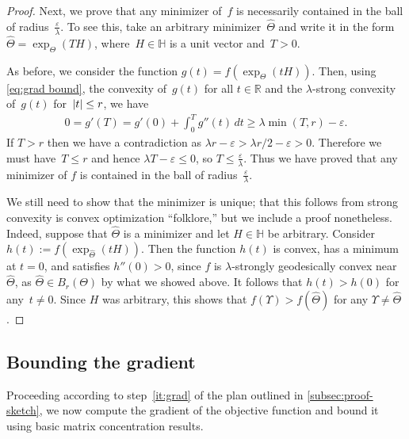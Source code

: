 \documentclass[aos]{imsart}
\theoremstyle{definition}
\numberwithin{equation}{section}
\DeclarePairedDelimiter{\abs}{\lvert}{\rvert}
\newcommand{\R}{{\mathbb{R}}}
\renewcommand{\H}{{\mathbb{H}}}
\newcommand{\htheta}{\widehat{\Theta}}
\newcommand{\eps}{\varepsilon}
\newcommand{\AR}[1]{{\color{orange}[AR: #1]}}
\begin{document}
\begin{proof}
Next, we prove that any minimizer of~$f$ is necessarily contained in the ball of radius~$\frac\eps\lambda$.
To see this, take an arbitrary minimizer~$\htheta$ and write it in the form $\htheta = \exp_\Theta(TH)$, where~$H\in \H$ is a unit vector and~$T>0$.


As before, we consider the function $g(t) = f(\exp_\Theta(tH))$.
Then, using \cref{eq:grad bound}, the convexity of~$g(t)$ for all $t\in\R$ and the $\lambda$-strong convexity of~$g(t)$ for~$\abs t \leq  r$, we have
\begin{align*}
  0 = g'(T) = g'(0) + \int_0^T g''(t) \, dt \geq \lambda \min(T,  r) - \eps.
\end{align*}
If $T> r$ then we have a contradiction as $\lambda r - \eps > \lambda r/2 - \eps > 0$.
Therefore we must have~$T\leq r$ and hence $\lambda T - \eps \leq 0$, so $T \leq \frac\eps\lambda$.
Thus we have proved that any minimizer of $f$ is contained in the ball of radius~$\frac\eps\lambda$.

We still need to show that the minimizer is unique; that this follows from strong convexity is convex optimization ``folklore,'' but we include a proof nonetheless.
Indeed, suppose that $\htheta$ is a minimizer and let $H\in \H$ be arbitrary.
Consider $h(t) := f(\exp_{\htheta}(tH))$.
Then the function $h(t)$ is convex, has a minimum at $t=0$, and satisfies $h''(0) > 0$, since $f$ is $\lambda$-strongly geodesically convex near~$\htheta$, as $\htheta \in B_r(\Theta)$ by what we showed above.
It follows that $h(t) > h(0)$ for any~$t\neq0$.
Since $H$ was arbitrary, this shows that $f(\Upsilon) > f(\htheta)$ for any $\Upsilon\neq \htheta$.
\end{proof}

\subsection{Bounding the gradient}
Proceeding according to step~\ref{it:grad} of the plan outlined in \cref{subsec:proof-sketch}, we now compute the gradient of the objective function and bound it using basic matrix concentration results.
\end{document}
